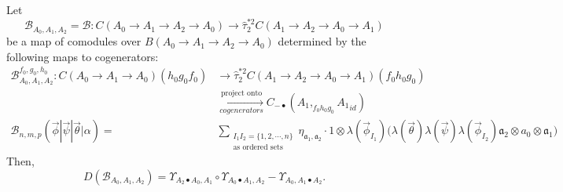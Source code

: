%
\begin{prop} \label{prop:c4}
Let 
$$
\mathcal{B}_{A_0,A_1,A_2} = \mathcal{B}: 
C(A_0 \to A_1 \to A_2 \to A_0)
\to \hat{\tau}_2^{*2}C(A_1 \to A_2 \to A_0 \to A_1)
$$ 
be a map of comodules over 
$B(A_0 \to A_1 \to A_2 \to A_0)$ 
determined by the following maps to 
cogenerators:
\begin{equation}
\label{eq:def_sigma2}
\begin{split}
\mathcal{B}^{f_0, g_0,h_0}_{A_0,A_1,A_2}: 
  C(A_0 \to A_1 \to A_0)(h_0g_0f_0) 
&\to
\hat{\tau}_2^{*2}C(A_1 \to A_2 \to A_0 \to A_1)
  (f_0h_0g_0)\\
&\xrightarrow[cogenerators]{\textrm{project onto}}
C_{-\bullet}(A_1, _{f_0h_0g_0}{A_1}_{id})\\
\mathcal{B}_{n, m, p} (\vec{\phi} | \vec{\psi} | \vec{\theta} | \alpha) 
= & \sum_{\substack{I_1I_2 = \{1,2,\cdots,n\} \\
                          \textrm{as ordered sets}}}
  \eta_{\mathfrak{a}_1,\mathfrak{a}_2}\cdot
  1 \otimes \lambda(\vec{\phi}_{I_1})\big( \lambda(\vec{\theta}) \lambda(\vec{\psi}) \lambda(\vec{\phi}_{I_2})
  \mathfrak{a}_2 \otimes a_0 \otimes \mathfrak{a}_1 \big)
\end{split}      
\end{equation}
Then, 
\begin{equation} \label{eq:prop4}
D(\mathcal{B}_{A_0,A_1,A_2}) = 
  \Upsilon_{A_2\bullet A_0, A_1} \circ
  \Upsilon_{A_0\bullet A_1, A_2} 
   - \Upsilon_{A_0, A_1\bullet A_2}.
\end{equation}
\end{prop}

